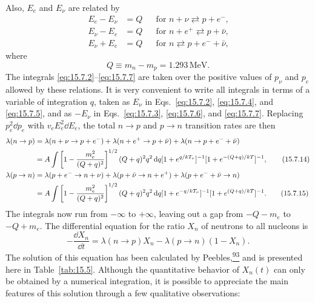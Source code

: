 Also, \(E_e\) and \(E_\nu\) are related by
\begin{align}
  E_e-E_\nu&=Q
  &&\text{for \(n+\nu\rightleftarrows p+e^-\),}
  \tag{15.7.10}\label{eq:15.7.10}\\
  E_\nu-E_e&=Q
  &&\text{for \(n+e^+\rightleftarrows p+\bar\nu\),}
  \tag{15.7.11}\label{eq:15.7.11}\\
  E_\nu+E_e&=Q
  &&\text{for \(n\rightleftarrows p+e^-+\bar\nu\),}
  \tag{15.7.12}\label{eq:15.7.12}
\end{align}
where
\begin{equation}
  Q\equiv m_n-m_p=1.293\,\mathrm{MeV}.
  \tag{15.7.13}\label{eq:15.7.13}
\end{equation}
The integrals \eqref{eq:15.7.2}--\eqref{eq:15.7.7} are taken over the
positive values of \(p_\nu\) and \(p_e\) allowed by these relations. It is
very convenient to write all integrals in terms of a variable of integration
\(q\), taken as \(E_\nu\) in Eqs.~\eqref{eq:15.7.2},
\eqref{eq:15.7.4}, and \eqref{eq:15.7.5}, and as \(-E_\nu\) in
Eqs.~\eqref{eq:15.7.3}, \eqref{eq:15.7.6}, and \eqref{eq:15.7.7}.
Replacing \(p_e^2\dd p_e\) with \(v_eE_e^2\dd E_e\), the total
\(n\to p\) and \(p\to n\) transition rates are then
\begin{align}
  \lambda(n\to p)
  &=
  \lambda(n+\nu\to p+e^-)
  +\lambda(n+e^+\to p+\bar\nu)
  +\lambda(n\to p+e^-+\bar\nu)
  \notag\\
  &=
  A\int
  \left[
    1-\frac{m_e^2}{(Q+q)^2}
  \right]^{1/2}
  (Q+q)^2q^2\mathop{}\!\mathrm{d} q
  [1+e^{q/kT_\nu}]^{-1}
  [1+e^{-(Q+q)/kT}]^{-1},
  \tag{15.7.14}\label{eq:15.7.14}\\
  \lambda(p\to n)
  &=
  \lambda(p+e^-\to n+\nu)
  +\lambda(p+\bar\nu\to n+e^+)
  +\lambda(p+e^-+\bar\nu\to n)
  \notag\\
  &=
  A\int
  \left[
    1-\frac{m_e^2}{(Q+q)^2}
  \right]^{1/2}
  (Q+q)^2q^2\mathop{}\!\mathrm{d} q
  [1+e^{-q/kT_\nu}]^{-1}
  [1+e^{(Q+q)/kT}]^{-1}.
  \tag{15.7.15}\label{eq:15.7.15}
\end{align}
The integrals now run from \(-\infty\) to \(+\infty\), leaving out a gap
from \(-Q-m_e\) to \(-Q+m_e\). The differential equation for the ratio
\(X_n\) of neutrons to all nucleons is
\begin{equation}
  -\frac{\dd X_n}{\dd t}
  =
  \lambda(n\to p)X_n
  -
  \lambda(p\to n)(1-X_n).
  \tag{15.7.16}\label{eq:15.7.16}
\end{equation}
The solution of this equation has been calculated by
Peebles,\hyperref[ch15-ref-93]{\textsuperscript{93}} and is presented here
in Table~\ref{tab:15.5}. Although the quantitative behavior of \(X_n(t)\)
can only be obtained by a numerical integration, it is possible to appreciate
the main features of this solution through a few qualitative observations:

